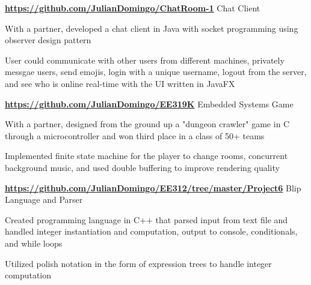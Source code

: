 \begin{cventries}
  \cventry
    {\normalsize \textbf{\url{https://github.com/JulianDomingo/ChatRoom-1}}}
    {\large Chat Client}
    {}
    {}
    {
      \begin{cvitems}
        \item {\normalsize With a partner, developed a chat client in Java with socket programming using observer design pattern}
        \item {\normalsize User could communicate with other users from different machines, privately messgae users, send emojis, login with a unique username, logout from the server, and see who is online real-time with the UI written in JavaFX}
      \end{cvitems}
    }
  \cventry
    {\normalsize \textbf{\url{https://github.com/JulianDomingo/EE319K}}}
    {\large Embedded Systems Game}
    {}
    {}
    {
      \begin{cvitems}
        \item {\normalsize With a partner, designed from the ground up a "dungeon crawler" game in C through a microcontroller and won third place in a class of 50+ teams}
        \item {\normalsize Implemented finite state machine for the player to change rooms, concurrent background music, and used double buffering to improve rendering quality}
      \end{cvitems}
    }
  \cventry
    {\normalsize \textbf{\url{https://github.com/JulianDomingo/EE312/tree/master/Project6}}}
    {\large Blip Language and Parser}
    {}
    {}
    {
      \begin{cvitems}
        \item {\normalsize Created programming language in C++ that parsed input from text file and handled integer instantiation and computation, output to console, conditionals, and while loops}
        \item {\normalsize Utilized polish notation in the form of expression trees to handle integer computation}
      \end{cvitems}
    }
\end{cventries}
